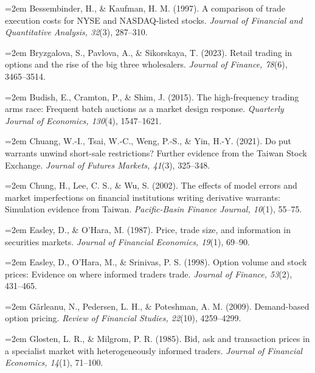 \documentclass[12pt,a4paper]{article}
\begin{document}
\noindent\hangindent=2em Bessembinder, H., \& Kaufman, H. M. (1997). A comparison of trade execution costs for NYSE and NASDAQ-listed stocks. \textit{Journal of Financial and Quantitative Analysis, 32}(3), 287–310.\par

\noindent\hangindent=2em Bryzgalova, S., Pavlova, A., \& Sikorskaya, T. (2023). Retail trading in options and the rise of the big three wholesalers. \textit{Journal of Finance, 78}(6), 3465–3514.\par

\noindent\hangindent=2em Budish, E., Cramton, P., \& Shim, J. (2015). The high-frequency trading arms race: Frequent batch auctions as a market design response. \textit{Quarterly Journal of Economics, 130}(4), 1547–1621.\par

\noindent\hangindent=2em Chuang, W.-I., Tsai, W.-C., Weng, P.-S., \& Yin, H.-Y. (2021). Do put warrants unwind short-sale restrictions? Further evidence from the Taiwan Stock Exchange. \textit{Journal of Futures Markets, 41}(3), 325–348.\par

\noindent\hangindent=2em Chung, H., Lee, C. S., \& Wu, S. (2002). The effects of model errors and market imperfections on financial institutions writing derivative warrants: Simulation evidence from Taiwan. \textit{Pacific-Basin Finance Journal, 10}(1), 55–75.\par

\noindent\hangindent=2em Easley, D., \& O'Hara, M. (1987). Price, trade size, and information in securities markets. \textit{Journal of Financial Economics, 19}(1), 69–90.\par

\noindent\hangindent=2em Easley, D., O'Hara, M., \& Srinivas, P. S. (1998). Option volume and stock prices: Evidence on where informed traders trade. \textit{Journal of Finance, 53}(2), 431–465.\par

\noindent\hangindent=2em Gârleanu, N., Pedersen, L. H., \& Poteshman, A. M. (2009). Demand-based option pricing. \textit{Review of Financial Studies, 22}(10), 4259–4299.\par

\noindent\hangindent=2em Glosten, L. R., \& Milgrom, P. R. (1985). Bid, ask and transaction prices in a specialist market with heterogeneously informed traders. \textit{Journal of Financial Economics, 14}(1), 71–100.\par
\end{document}
